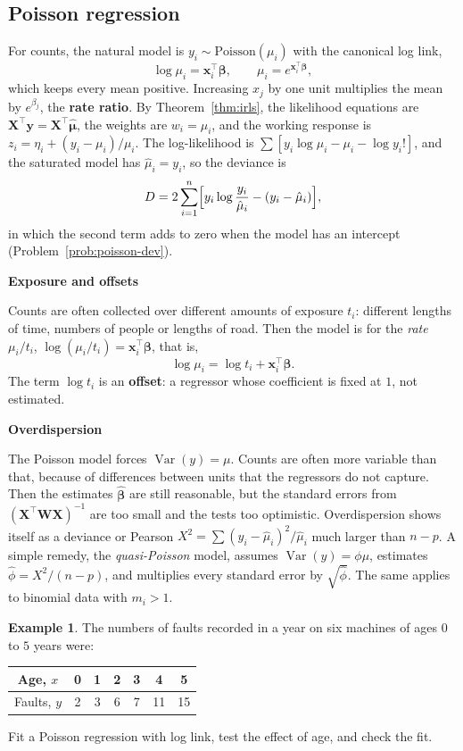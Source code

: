 \documentclass[11pt,a4paper]{article}
\numberwithin{equation}{section}
\theoremstyle{definition}
\newtheorem{exa}[thm]{Example}
\newcommand{\subhead}[1]{%
  \par\medskip\noindent\textbf{#1}\par\nobreak\smallskip}
\begin{document}
\subsection{Poisson regression}
For counts, the natural model is $y_i \sim \text{Poisson}(\mu_i)$ with the canonical log link,
\[
\log\mu_i = \mathbf{x}_i^\top\boldsymbol\beta , \qquad \mu_i = e^{\mathbf{x}_i^\top\boldsymbol\beta} ,
\]
which keeps every mean positive. Increasing $x_j$ by one unit multiplies the mean by $e^{\beta_j}$, the \textbf{rate
ratio}. By Theorem~\ref{thm:irls}, the likelihood equations are $\mathbf{X}^\top\mathbf{y} = \mathbf{X}^\top\hat{\boldsymbol\mu}$, the weights are $w_i = \mu_i$, and the
working response is $z_i = \eta_i + (y_i - \mu_i)/\mu_i$. The log-likelihood is $\sum[y_i\log\mu_i - \mu_i - \log y_i!]$, and the saturated model
has $\hat\mu_i = y_i$, so the deviance is
\[
D = 2\sum_{i=1}^n\Bigl[y_i\log\frac{y_i}{\hat\mu_i} - (y_i - \hat\mu_i)\Bigr] ,
\]
in which the second term adds to zero when the model has an intercept (Problem~\ref{prob:poisson-dev}).

\subhead{Exposure and offsets}
Counts are often collected over different amounts of exposure $t_i$: different lengths of time, numbers of
people or lengths of road. Then the model is for the \emph{rate} $\mu_i/t_i$, $\log(\mu_i/t_i) = \mathbf{x}_i^\top\boldsymbol\beta$, that is,
\[
\log\mu_i = \log t_i + \mathbf{x}_i^\top\boldsymbol\beta .
\]
The term $\log t_i$ is an \textbf{offset}: a regressor whose coefficient is fixed at $1$, not estimated.

\subhead{Overdispersion}
The Poisson model forces $\operatorname{Var}(y) = \mu$. Counts are often more variable than that, because of
differences between units that the regressors do not capture. Then the estimates $\hat{\boldsymbol\beta}$ are still
reasonable, but the standard errors from $(\mathbf{X}^\top\mathbf{WX})^{-1}$ are too small and the tests too optimistic.
Overdispersion shows itself as a deviance or Pearson $X^2 = \sum(y_i - \hat\mu_i)^2/\hat\mu_i$ much larger than $n - p$. A simple
remedy, the \emph{quasi-Poisson} model, assumes $\operatorname{Var}(y) = \phi\mu$, estimates $\hat\phi = X^2/(n - p)$, and multiplies every
standard error by $\sqrt{\hat\phi}$. The same applies to binomial data with $m_i > 1$.

\begin{exa}\label{exa:faults}
The numbers of faults recorded in a year on six machines of ages $0$ to $5$ years were:
\begin{center}
\begin{tabular}{c|cccccc}
Age, $x$ & 0 & 1 & 2 & 3 & 4 & 5 \\
\hline
Faults, $y$ & 2 & 3 & 6 & 7 & 11 & 15 \\
\end{tabular}
\end{center}
Fit a Poisson regression with log link, test the effect of age, and check the fit.
\end{exa}
\end{document}
